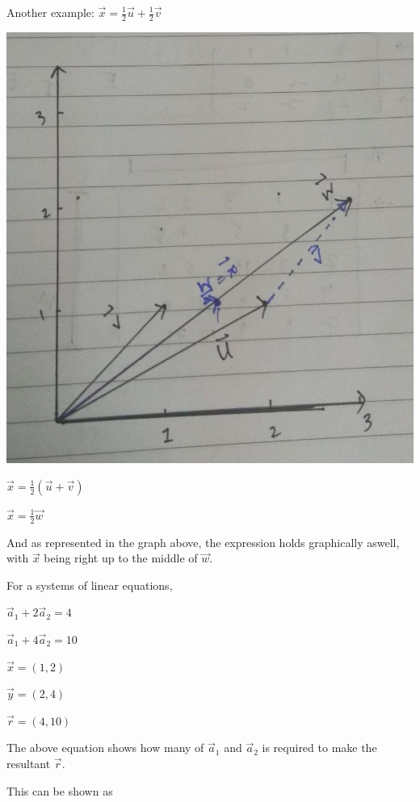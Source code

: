 \documentclass[a4paper, 11pt]{article}
\begin{document}
\begin{enumerate}
Another example: $\vec x = \frac{1}{2}\vec u + \frac{1}{2}\vec v$

\begin{center}
  \includegraphics[width=\linewidth]{images/uvwx.jpg}
\end{center}

$\vec x = \frac{1}{2}(\vec u + \vec v)$

$\vec x = \frac{1}{2}\vec w$

And as represented in the graph above, the expression holds graphically aswell, with $\vec x$ being right up to the middle of $\vec w$.

For a systems of linear equations, 

\begin{center}
	$\vec a_1 + 2\vec a_2 = 4$ 

	$\vec a_1 + 4\vec a_2 = 10$
\end{center}  

	$\vec x = (1, 2)$

	$\vec y = (2, 4)$ 
	
	$\vec r = (4, 10)$

	The above equation shows how many of $\vec a_1$ and $\vec a_2$ is required to make the resultant $\vec r$.

	This can be shown as
	

\end{enumerate}
\end{document}
